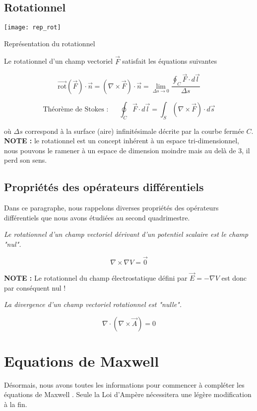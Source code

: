 \subsection{Rotationnel} 
\begin{marginfigure}
	\texttt{[image: rep\_rot]}
	\caption{Représentation du rotationnel}
\end{marginfigure}

Le rotationnel d'un champ vectoriel $\vec{F}$ satisfait les équations suivantes  

\[  \vec{\text{rot}}(\vec{F}) \cdot \vec{n}   = (\nabla \times \vec{F}) \cdot \vec{n} = \lim_{\Delta s \to 0} \frac{\oint_{C} \vec{F} \cdot d\vec{l} }{\Delta s}\]

\[\mbox{Théorème de Stokes : } \hspace{15pt} \oint_{C} \vec{F} \cdot d\vec{l} = \int_{S} (\nabla \times \vec{F}) \cdot d\vec{s}\]

où $\Delta s$ correspond à la surface (aire) infinitésimale décrite par la courbe fermée $C$. \\
\textbf{NOTE : } le rotationnel est un concept inhérent à un espace tri-dimensionnel, nous pouvons le ramener à un espace de dimension moindre 
mais au delà de 3, il perd son sens.

\subsection{Propriétés des opérateurs différentiels}

Dans ce paragraphe, nous rappelons diverses propriétés des opérateurs différentiels que nous avons étudiées au second quadrimestre. 

\textit{Le rotationnel d'un champ vectoriel dérivant d'un potentiel scalaire est le champ "nul".} 

\[\nabla \times \nabla V = \vec{0} \] 

\textbf{NOTE : } Le rotationnel du champ électrostatique défini par $\vec{E} = -\nabla V$ est donc par conséquent nul !

\textit{La divergence d'un champ vectoriel rotationnel est  "nulle".}  

\[\nabla \cdot (\nabla \times \vec{A})  = 0 \]

\section{Equations de Maxwell}
Désormais, nous avons toutes les informations pour commencer à compléter les équations de Maxwell . 
Seule la Loi d'Ampère nécessitera une légère modification à la fin.

